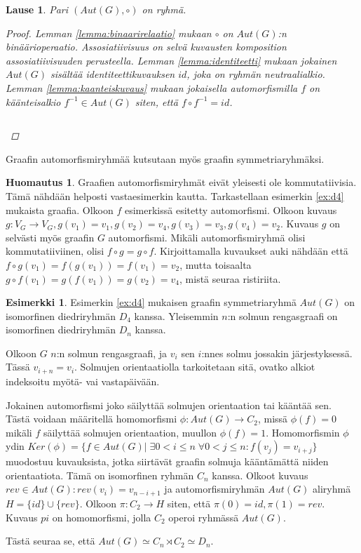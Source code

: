 \documentclass[a4paper, 12pt]{article}
\theoremstyle{definition}
\newtheorem{huom}{Huomautus}
\newtheorem{example}[mydef]{Esimerkki}
\theoremstyle{plain}
\newtheorem{teor}[mydef]{Lause}
\begin{document}
\begin{teor}
Pari $(Aut(G), \circ)$ on ryhmä.
\begin{proof}
Lemman \ref{lemma:binaarirelaatio} mukaan $\circ$ on $Aut(G)$:n binäärioperaatio. Assosiatiivisuus on selvä kuvausten komposition assosiatiivisuuden perusteella. Lemman \ref{lemma:identiteetti} mukaan jokainen $Aut(G)$ sisältää identiteettikuvauksen $id$, joka on ryhmän neutraalialkio. Lemman \ref{lemma:kaanteiskuvaus} mukaan jokaisella automorfismilla $f$ on käänteisalkio $f^{-1} \in Aut(G)$ siten, että $f \circ f^{-1} = id$.
\begin{center}
\begin{math}
\end{math}
\end{center}
\end{proof}
\end{teor}

Graafin automorfismiryhmää kutsutaan myös graafin symmetriaryhmäksi.

\begin{huom}
Graafien automorfismiryhmät eivät yleisesti ole kommutatiivisia.\\
Tämä nähdään helposti vastaesimerkin kautta. Tarkastellaan esimerkin \ref{ex:d4} mukaista graafia. Olkoon $f$ esimerkissä esitetty automorfismi. Olkoon kuvaus $g: V_G \rightarrow V_G, g(v_1) = v_1, g(v_2) = v_4, g(v_3) = v_3, g(v_4) = v_2$. Kuvaus $g$ on selvästi myös graafin $G$ automorfismi. Mikäli automorfismiryhmä olisi kommutatiiviinen, olisi $f \circ g = g \circ f$. Kirjoittamalla kuvaukset auki nähdään että $f \circ g(v_1) = f(g(v_1)) = f(v_1) = v_2$, mutta toisaalta $g \circ f (v_1) = g(f(v_1)) = g(v_2) = v_4$, mistä seuraa ristiriita.
\end{huom}

\begin{example}
Esimerkin \ref{ex:d4} mukaisen graafin symmetriaryhmä $Aut(G)$ on isomorfinen diedriryhmän $D_4$ kanssa. Yleisemmin $n$:n solmun rengasgraafi on isomorfinen diedriryhmän $D_n$ kanssa.

Olkoon $G$ $n$:n solmun rengasgraafi, ja $v_i$ sen $i$:nnes solmu jossakin järjestyksessä. Tässä $v_{i + n} = v_{i}$. Solmujen orientaatiolla tarkoitetaan sitä, ovatko alkiot indeksoitu myötä- vai vastapäivään.

Jokainen automorfismi joko säilyttää solmujen orientaation tai kääntää sen. Tästä voidaan määritellä homomorfismi $\phi: Aut(G) \rightarrow C_2$, missä $\phi(f) = 0$ mikäli $f$ säilyttää solmujen orientaation, muullon $\phi(f) = 1$. Homomorfismin $\phi$ ydin $Ker(\phi) = \{f \in Aut(G) |\; \exists 0 < i \leq n \; \forall 0 < j \leq n: f(v_j) = v_{i + j}\}$ muodostuu kuvauksista, jotka siirtävät graafin solmuja kääntämättä niiden orientaatiota. Tämä on isomorfinen ryhmän $C_n$ kanssa. Olkoot kuvaus $rev \in Aut(G):  rev(v_i) = v_{n - i + 1}$ ja automorfismiryhmän $Aut(G)$ aliryhmä $H = \{ id \} \cup \{ rev \}$. Olkoon $\pi: C_2 \rightarrow H$ siten, että $\pi(0) = id, \pi(1) = rev$. Kuvaus $pi$ on homomorfismi, jolla $C_2$ operoi ryhmässä $Aut(G)$.

Tästä seuraa se, että $Aut(G) \simeq C_n \rtimes C_2 \simeq D_n$.
\end{example}
\end{document}

